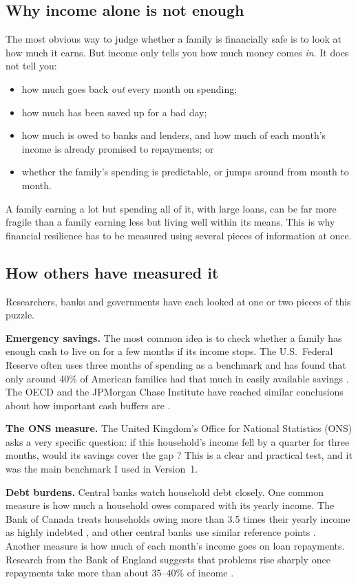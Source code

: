 \documentclass[11pt,a4paper]{article}
\newcommand{\pct}{\%}
\begin{document}
\subsection{Why income alone is not enough}
The most obvious way to judge whether a family is financially safe is to look at how much it earns. But income only
tells you how much money comes \emph{in}. It does not tell you:
\begin{itemize}
\item how much goes back \emph{out} every month on spending;
\item how much has been saved up for a bad day;
\item how much is owed to banks and lenders, and how much of each month's income is already promised to repayments; or
\item whether the family's spending is predictable, or jumps around from month to month.
\end{itemize}
A family earning a lot but spending all of it, with large loans, can be far more fragile than a family earning less
but living well within its means. This is why financial resilience has to be measured using several pieces of
information at once.

\subsection{How others have measured it}
Researchers, banks and governments have each looked at one or two pieces of this puzzle.

\textbf{Emergency savings.} The most common idea is to check whether a family has enough cash to live on for a few
months if its income stops. The U.S.\ Federal Reserve often uses three months of spending as a benchmark and has found
that only around 40\pct{} of American families had that much in easily available savings \cite{bhutta2018,bhutta2021,fed2026}.
The OECD and the JPMorgan Chase Institute have reached similar conclusions about how important cash buffers are
\cite{oecd2024,jpmc2015,jpmc2019}.

\textbf{The ONS measure.} The United Kingdom's Office for National Statistics (ONS) asks a very specific question: if
this household's income fell by a quarter for three months, would its savings cover the gap \cite{ons}? This is a clear
and practical test, and it was the main benchmark I used in Version~1.

\textbf{Debt burdens.} Central banks watch household debt closely. One common measure is how much a household owes
compared with its yearly income. The Bank of Canada treats households owing more than 3.5 times their yearly income as
highly indebted \cite{boc}, and other central banks use similar reference points \cite{bis_ifc,apra,fca}. Another measure
is how much of each month's income goes on loan repayments. Research from the Bank of England suggests that problems
rise sharply once repayments take more than about 35--40\pct{} of income \cite{boe2019,boe2022,bis_dsr}.
\end{document}
